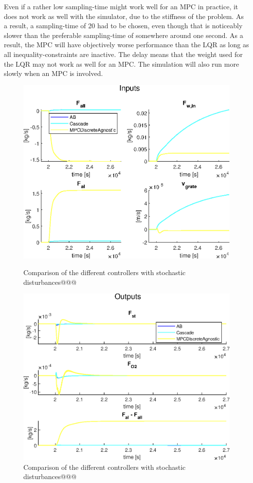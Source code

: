 Even if a rather low sampling-time might work well for an MPC in practice, it does not work as well with the simulator, due to the stiffness of the problem. As a result, a sampling-time of 20 had to be chosen, even though that is noticeably slower than the preferable sampling-time of somewhere around one second. As a result, the MPC will have objectively worse performance than the LQR as long as all inequality-constraints are inactive. The delay means that the weight used for the LQR may not work as well for an MPC. The simulation will also run more slowly when an MPC is involved.
\begin{figure}
    \includegraphics[width=\textwidth]{img/Fig_dump/outputs_ABCascadeMPCDiscreteAgnosticStep_Q_all.eps}
    \label{fig:discrete_mpc_outputs}
    \caption{Comparison of the different controllers with stochastic disturbances@@@}
\end{figure}

\begin{figure}
    \includegraphics[width=\textwidth]{img/Fig_dump/inputs_ABCascadeMPCDiscreteAgnosticStep_Q_all.eps}
    \caption{Comparison of the different controllers with stochastic disturbances@@@}
\end{figure}


